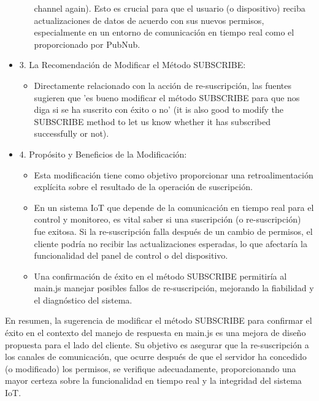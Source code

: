 \documentclass{report}
\begin{document}
\begin{itemize}
\begin{itemize}
            channel again). Esto es crucial para que el usuario (o dispositivo) reciba actualizaciones de datos de acuerdo con sus nuevos permisos, 
            especialmente en un entorno de comunicación en tiempo real como el proporcionado por PubNub.
        \end{itemize}
    \item 3. La Recomendación de Modificar el Método SUBSCRIBE:
        \begin{itemize}
            \item Directamente relacionado con la acción de re-suscripción, las fuentes sugieren que 'es bueno modificar el método SUBSCRIBE para 
            que nos diga si se ha suscrito con éxito o no' (it is also good to modify the SUBSCRIBE method to let us know whether it has subscribed 
            successfully or not).
        \end{itemize}
    \item 4. Propósito y Beneficios de la Modificación:
        \begin{itemize}
            \item Esta modificación tiene como objetivo proporcionar una retroalimentación explícita sobre el resultado de la operación de suscripción.
            \item En un sistema IoT que depende de la comunicación en tiempo real para el control y monitoreo, es vital saber si una suscripción 
            (o re-suscripción) fue exitosa. Si la re-suscripción falla después de un cambio de permisos, el cliente podría no recibir las actualizaciones 
            esperadas, lo que afectaría la funcionalidad del panel de control o del dispositivo.
            \item Una confirmación de éxito en el método SUBSCRIBE permitiría al main.js manejar posibles fallos de re-suscripción, mejorando la 
            fiabilidad y el diagnóstico del sistema.
        \end{itemize}
\end{itemize}
En resumen, la sugerencia de modificar el método SUBSCRIBE para confirmar el éxito en el contexto del manejo de respuesta en main.js es 
una mejora de diseño propuesta para el lado del cliente. Su objetivo es asegurar que la re-suscripción a los canales de comunicación, que 
ocurre después de que el servidor ha concedido (o modificado) los permisos, se verifique adecuadamente, proporcionando una mayor certeza 
sobre la funcionalidad en tiempo real y la integridad del sistema IoT.
\end{document}
